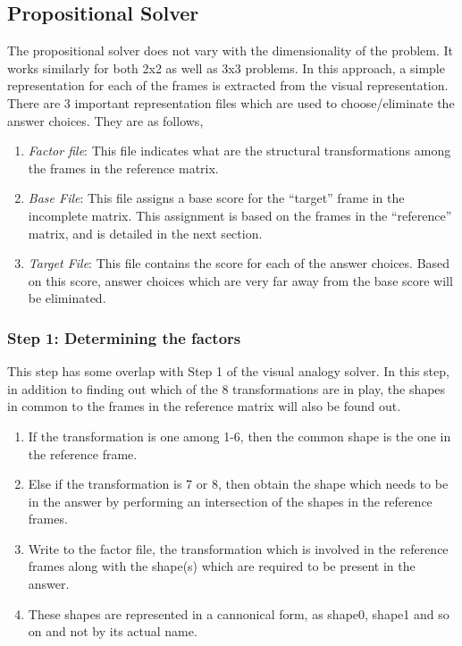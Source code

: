 \documentclass[10pt, letter]{article}
\begin{document}
\subsection*{Propositional Solver}
The propositional solver does not vary with the dimensionality of the problem. It works similarly for both 2x2 as well as 3x3 problems. In this approach, a simple representation for each of the frames is extracted from the visual representation. There are 3 important representation files which are used to choose/eliminate the answer choices. They are as follows,
\begin{enumerate}
	\item \textit{Factor file}: This file indicates what are the structural transformations among the frames in the reference matrix.
	\item \textit{Base File}: This file assigns a base score for the ``target'' frame in the incomplete matrix. This assignment is based on the frames in the ``reference'' matrix, and is detailed in the next section.
	\item \textit{Target File}: This file contains the score for each of the answer choices. Based on this score, answer choices which are very far away from the base score will be eliminated.
\end{enumerate}

\subsubsection*{Step 1: Determining the factors}
This step has some overlap with Step 1 of the visual analogy solver. In this step, in addition to finding out which of the 8 transformations are in play, the shapes in common to the frames in the reference matrix will also be found out. 
\begin{enumerate}
	\item If the transformation is one among 1-6, then the common shape is the one in the reference frame.
	\item Else if the transformation is 7 or 8, then obtain the shape which needs to be in the answer by performing an intersection of the shapes in the reference frames.
	\item Write to the factor file, the transformation which is involved in the reference frames along with the shape(s) which are required to be present in the answer.
	\item These shapes are represented in a cannonical form, as shape0, shape1 and so on and not by its actual name.
\end{enumerate}
\end{document}
